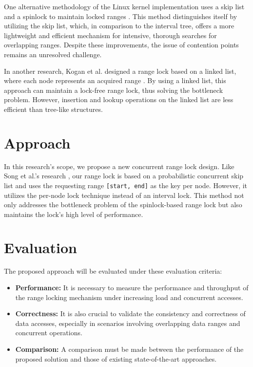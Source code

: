 One alternative methodology of the Linux kernel implementation uses a skip list and a spinlock to maintain locked ranges \parencite{migrationWM2023}. This method distinguishes itself by utilizing the skip list, which, in comparison to the interval tree, offers a more lightweight and efficient mechanism for intensive, thorough searches for overlapping ranges. Despite these improvements, the issue of contention points remains an unresolved challenge.

In another research, Kogan et al. designed a range lock based on a linked list, where each node represents an acquired range \parencite{scalableRangeLock2020}. By using a linked list, this approach can maintain a lock-free range lock, thus solving the bottleneck problem. However, insertion and lookup operations on the linked list are less efficient than tree-like structures. 

\newpage

\section{Approach}
In this research's scope, we propose a new concurrent range lock design. Like Song et al.'s research \parencite{linuxRangeLockImpl2013}, our range lock is based on a probabilistic concurrent skip list and uses the requesting range \texttt{[start, end]} as the key per node. However, it utilizes the per-node lock technique instead of an interval lock. This method not only addresses the bottleneck problem of the spinlock-based range lock but also maintains the lock's high level of performance. 

\section{Evaluation}
The proposed approach will be evaluated under these evaluation criteria:
\begin{itemize}
    \item \textbf{Performance:} It is necessary to measure the performance and throughput of the range locking mechanism under increasing load and concurrent accesses.
    \item \textbf{Correctness:} It is also crucial to validate the consistency and correctness of data accesses, especially in scenarios involving overlapping data ranges and concurrent operations.
    \item \textbf{Comparison:} A comparison must be made between the performance of the proposed solution and those of existing state-of-the-art approaches.
\end{itemize}

